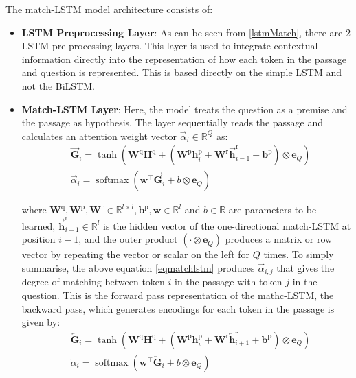 \documentclass[a4paper,12pt]{report}
\begin{document}
             The match-LSTM model architecture consists of:
             \begin{itemize}
             	\item \textbf{LSTM Preprocessing Layer}: As can be seen from \ref{lstmMatch}, there are 2 LSTM pre-processing layers. This layer is used to integrate contextual information directly into the representation of how each token in the passage and question is represented. This is based directly on the simple LSTM \citep{lstmoriginal} and not the BiLSTM.
             	\item \textbf{Match-LSTM Layer}: Here, the model treats the question as a premise and the passage as hypothesis. The layer sequentially reads the passage and calculates an attention weight vector $ \vec{\alpha}_{i} \in \mathbb{R}^{Q}$ as:
             	\begin{equation}\label{eqmatchlstm}
             		\begin{aligned}
             			&\overrightarrow{\mathbf{G}}_{i}=\tanh \left(\mathbf{W}^{\mathrm{q}} \mathbf{H}^{\mathrm{q}}+\left(\mathbf{W}^{\mathrm{p}} \mathbf{h}_{i}^{\mathrm{p}}+\mathbf{W}^{\mathrm{r}} \overrightarrow{\mathbf{h}}_{i-1}^{\mathrm{r}}+\mathbf{b}^{\mathrm{p}}\right) \otimes \mathbf{e}_{Q}\right) \\
             			&\vec{\alpha}_{i}=\operatorname{softmax}\left(\mathbf{w}^{\top} \overrightarrow{\mathbf{G}}_{i}+b \otimes \mathbf{e}_{Q}\right)
             		\end{aligned}
             	\end{equation}

			where $\mathbf{W}^{\mathrm{q}}, \mathbf{W}^{\mathrm{p}}, \mathbf{W}^{\mathrm{r}} \in \mathbb{R}^{l \times l}, \mathbf{b}^{\mathrm{p}}, \mathbf{w} \in \mathbb{R}^{l}$ and $b \in \mathbb{R}$ are parameters to be learned, $\overrightarrow{\mathbf{h}}_{i-1}^{\mathrm{r}} \in \mathbb{R}^{l}$ is the hidden vector of the one-directional match-LSTM at position $i-1$, and the outer product $\left(\cdot \otimes \mathbf{e}_{Q}\right)$ produces a matrix or row vector by repeating the vector or scalar on the left for $Q$ times.
			To simply summarise, the above equation \ref{eqmatchlstm} produces  $ \vec{\alpha}_{i,j} $ that gives the degree of matching between token $ i $ in the passage with token $ j $ in the question. This is the forward pass representation of the mathc-LSTM, the backward pass, which generates encodings for each token in the passage is given by:
			\begin{equation}\label{eqmatchlstmreverse}
				\begin{aligned}
					&\overleftarrow{\mathbf{G}}_{i}=\tanh \left(\mathbf{W}^{\mathrm{q}} \mathbf{H}^{\mathrm{q}}+\left(\mathbf{W}^{\mathrm{p}} \mathbf{h}_{i}^{\mathrm{p}}+\mathbf{W}^{\mathrm{r}} \overleftarrow{\mathbf{h}}_{i+1}^{\mathrm{r}}+\mathbf{b}^{\mathbf{p}}\right) \otimes \mathbf{e}_{Q}\right) \\
					&\overleftarrow{\alpha}_{i}=\operatorname{softmax}\left(\mathbf{w}^{\top} \overleftarrow{\mathbf{G}}_{i}+b \otimes \mathbf{e}_{Q}\right)
				\end{aligned}
			\end{equation}


\end{itemize}
\end{document}
